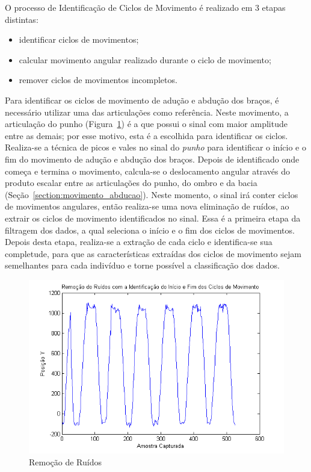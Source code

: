 O processo de Identificação de Ciclos de Movimento é realizado em 3 etapas distintas:
\begin{itemize}
	\item identificar ciclos de movimentos;
	\item calcular movimento angular realizado durante o ciclo de movimento;
	\item remover ciclos de movimentos incompletos.
\end{itemize}

Para identificar os ciclos de movimento de adução e abdução dos braços, é necessário utilizar uma das articulações como referência. Neste movimento, a articulação do punho (Figura~\ref{img:remocaoruidossinal}) é a que possui o sinal com maior amplitude entre as demais; por esse motivo, esta é a escolhida para identificar os ciclos. Realiza-se a técnica de picos e vales no sinal do \textit{punho} para identificar o início e o fim do movimento de adução e abdução dos braços. Depois de identificado onde começa e termina o movimento, calcula-se o deslocamento angular através do produto escalar entre as articulações do punho, do ombro e da bacia (Seção~\ref{section:movimento_abducao}). Neste momento, o sinal irá conter ciclos de movimentos angulares, então realiza-se uma nova eliminação de ruídos, ao extrair os ciclos de movimento identificados no sinal. Essa é a primeira etapa da filtragem dos dados, a qual seleciona o início e o fim dos ciclos de movimentos. Depois desta etapa, realiza-se a extração de cada 
ciclo e 
identifica-se sua completude, para que as características extraídas dos ciclos de movimento sejam semelhantes para cada indivíduo e torne possível a classificação dos dados.

\begin{figure}[!htb]
     \centering
     \includegraphics[width=1\textwidth]{./img/remocaoruidociclo.png}
     \caption{Remoção de Ruídos}
     \label{img:remocaoruidossinal}
\end{figure}


